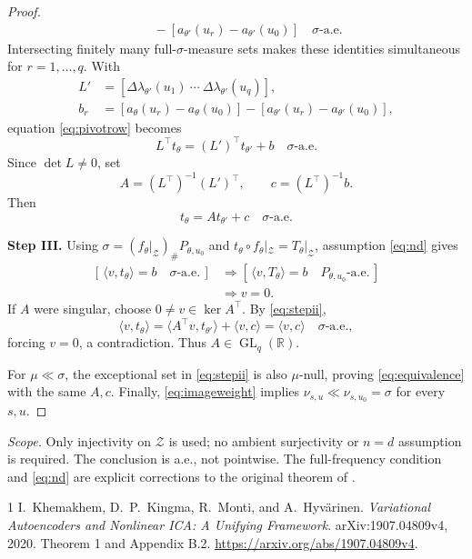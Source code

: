 \documentclass[11pt,a4paper]{article}
\newcommand{\R}{\mathbb R}
\newcommand{\Zset}{\mathcal Z}
\newcommand{\aev}{\text{-a.e.}}
\newcommand{\push}{_{\#}}
\newcommand{\GL}{\operatorname{GL}}
\newcommand{\ip}[2]{\langle #1,#2\rangle}
\begin{document}
\begin{proof}
\begin{align}
 &\quad-[a_{\theta'}(u_r)-a_{\theta'}(u_0)]
 \quad\sigma\aev \label{eq:pivotrow}
\end{align}
Intersecting finitely many full-$\sigma$-measure sets makes these identities
simultaneous for $r=1,\ldots,q$. With
\[
 \begin{aligned}
 L'&=[\Delta\lambda_{\theta'}(u_1)\ \cdots\
          \Delta\lambda_{\theta'}(u_q)],\\
 b_r&=[a_\theta(u_r)-a_\theta(u_0)]
       -[a_{\theta'}(u_r)-a_{\theta'}(u_0)],
 \end{aligned}
\]
equation \eqref{eq:pivotrow} becomes
\begin{equation}
 L^\top t_\theta=(L')^\top t_{\theta'}+b\quad\sigma\aev \label{eq:matrix}
\end{equation}
Since $\det L\ne0$, set
\begin{equation}
 A=(L^\top)^{-1}(L')^\top,\qquad c=(L^\top)^{-1}b. \label{eq:witness}
\end{equation}
Then
\begin{equation}
 t_\theta=A t_{\theta'}+c\quad\sigma\aev \label{eq:stepii}
\end{equation}

\medskip
\noindent\textbf{Step III.}
Using $\sigma=(f_\theta|_{\Zset})\push P_{\theta,u_0}$ and
$t_\theta\circ f_\theta|_{\Zset}=T_\theta|_{\Zset}$, assumption \eqref{eq:nd} gives
\[
 \begin{aligned}
 [\,\ip{v}{t_\theta}=b\quad\sigma\aev\,]
 &\Longrightarrow
 [\,\ip{v}{T_\theta}=b\quad P_{\theta,u_0}\aev\,]\\
 &\Longrightarrow v=0.
 \end{aligned}
\]
If $A$ were singular, choose $0\ne v\in\ker A^\top$. By \eqref{eq:stepii},
\[
 \ip{v}{t_\theta}
 =\ip{A^\top v}{t_{\theta'}}+\ip{v}{c}
 =\ip{v}{c}\quad\sigma\aev,
\]
forcing $v=0$, a contradiction. Thus $A\in\GL_q(\R)$.

For $\mu\ll\sigma$, the exceptional set in \eqref{eq:stepii} is also
$\mu$-null, proving \eqref{eq:equivalence} with the same $A,c$.
Finally, \eqref{eq:imageweight} implies
$\nu_{s,u}\ll\nu_{s,u_0}=\sigma$ for every $s,u$.
\end{proof}

\noindent\emph{Scope.}
Only injectivity on $\Zset$ is used; no ambient surjectivity or
$n=d$ assumption is required. The conclusion is a.e., not pointwise.
The full-frequency condition and \eqref{eq:nd} are explicit corrections
to the original theorem of \cite{ivae}.

\begin{thebibliography}{1}
I.~Khemakhem, D.~P.~Kingma, R.~Monti, and A.~Hyv\"arinen.
\emph{Variational Autoencoders and Nonlinear ICA: A Unifying Framework}.
arXiv:1907.04809v4, 2020. Theorem 1 and Appendix B.2.
\url{https://arxiv.org/abs/1907.04809v4}.
\end{thebibliography}
\end{document}

